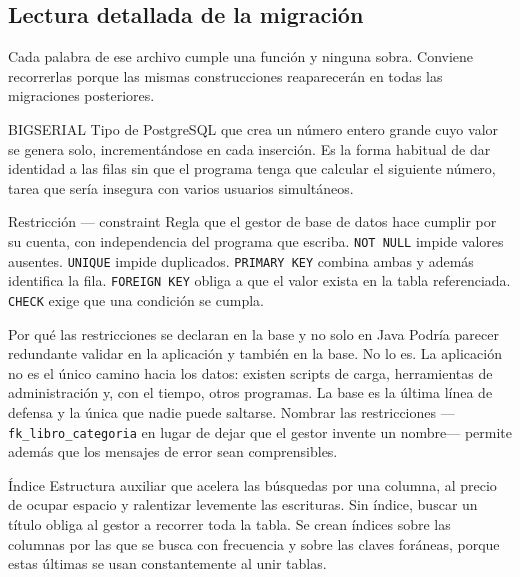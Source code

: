 \documentclass[11pt,a4paper,openany]{book}
\begin{document}
\subsection{Lectura detallada de la migración}
\label{sec:lectura-migracion}

Cada palabra de ese archivo cumple una función y ninguna sobra. Conviene recorrerlas porque las mismas construcciones reaparecerán en todas las migraciones posteriores.

\begin{cajadefinicion}{BIGSERIAL}
	Tipo de PostgreSQL que crea un número entero grande cuyo valor se genera solo, incrementándose en cada inserción. Es la forma habitual de dar identidad a las filas sin que el programa tenga que calcular el siguiente número, tarea que sería insegura con varios usuarios simultáneos.
\end{cajadefinicion}

\begin{cajadefinicion}{Restricción --- constraint}
	Regla que el gestor de base de datos hace cumplir por su cuenta, con independencia del programa que escriba. \texttt{NOT NULL} impide valores ausentes. \texttt{UNIQUE} impide duplicados. \texttt{PRIMARY KEY} combina ambas y además identifica la fila. \texttt{FOREIGN KEY} obliga a que el valor exista en la tabla referenciada. \texttt{CHECK} exige que una condición se cumpla.
\end{cajadefinicion}

\begin{cajabuenas}{Por qué las restricciones se declaran en la base y no solo en Java}
	Podría parecer redundante validar en la aplicación y también en la base. No lo es. La aplicación no es el único camino hacia los datos: existen scripts de carga, herramientas de administración y, con el tiempo, otros programas. La base es la última línea de defensa y la única que nadie puede saltarse. Nombrar las restricciones ---\texttt{fk\_libro\_categoria} en lugar de dejar que el gestor invente un nombre--- permite además que los mensajes de error sean comprensibles.
\end{cajabuenas}

\begin{cajadefinicion}{Índice}
	Estructura auxiliar que acelera las búsquedas por una columna, al precio de ocupar espacio y ralentizar levemente las escrituras. Sin índice, buscar un título obliga al gestor a recorrer toda la tabla. Se crean índices sobre las columnas por las que se busca con frecuencia y sobre las claves foráneas, porque estas últimas se usan constantemente al unir tablas.
\end{cajadefinicion}
\end{document}
